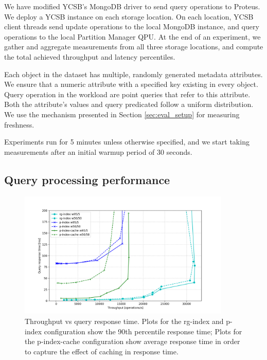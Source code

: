 We have modified YCSB's MongoDB driver to send query operations to Proteus.
We deploy a YCSB instance on each storage location.
On each location, YCSB client threads send update operations to the local MongoDB instance,
and query operations to the local Partition Manager QPU.
At the end of an experiment, we gather and aggregate measurements from all three storage locations,
and compute the total achieved throughput and latency percentiles.

Each object in the dataset has multiple, randomly generated metadata attributes.
We ensure that a numeric attribute with a specified key existing in every object.
Query operation in the workload are point queries that refer to this attribute.
Both the attribute's values and query predicated follow a uniform distribution.
We use the mechanism presented in Section \ref{sec:eval_setup} for measuring freshness.

Experiments run for 5 minutes unless otherwise specified, and we start taking measurements after an initial
warmup period of 30 seconds.

\subsection{Query processing performance}

\begin{figure}[H]
\centering
  \includegraphics[width=0.9\textwidth]{./figures/evaluation/ycsb_responseTime.png}
  \caption{Throughput vs query response time. Plots for the rg-index and p-index configuration show the 90th percentile response time;
  Plots for the p-index-cache configuration show average response time in order to capture the effect of caching in response time.}
  \label{fig:ycsb_responseTime}
\end{figure}

